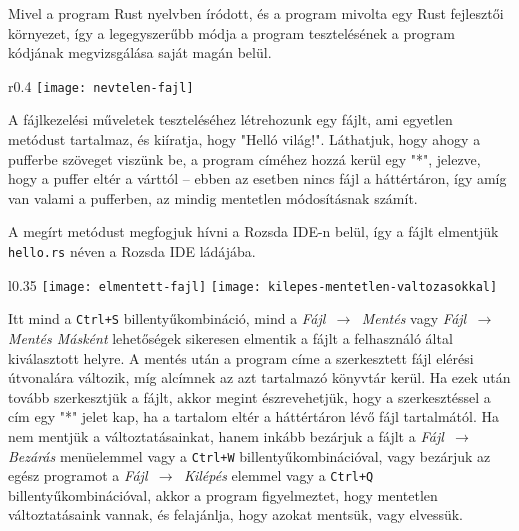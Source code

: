 

Mivel a program Rust nyelvben íródott, és a program mivolta egy Rust fejlesztői környezet,
így a legegyszerűbb módja a program tesztelésének a program kódjának megvizsgálása saját magán belül.


\begin{wrapfigure}{r}{0.4\textwidth}
    \centering
    \texttt{[image: nevtelen-fajl]}
\end{wrapfigure}

A fájlkezelési műveletek teszteléséhez létrehozunk egy fájlt, ami egyetlen metódust tartalmaz,
és kiíratja, hogy "Helló világ!". 
Láthatjuk, hogy ahogy a pufferbe szöveget viszünk be, a program címéhez hozzá kerül egy "*",
jelezve, hogy a puffer eltér a várttól -- ebben az esetben nincs fájl a háttértáron,
így amíg van valami a pufferben, az mindig mentetlen módosításnak számít.

A megírt metódust megfogjuk hívni a Rozsda IDE-n belül, így a fájlt elmentjük \texttt{hello.rs}
néven a Rozsda IDE ládájába.

\begin{wrapfigure}{l}{0.35\textwidth}
    \centering
    \texttt{[image: elmentett-fajl]}
    \texttt{[image: kilepes-mentetlen-valtozasokkal]}
\end{wrapfigure}

Itt mind a \texttt{Ctrl+S} billentyűkombináció, mind a \textit{Fájl $\,\to\,$ Mentés} vagy \textit{Fájl $\,\to\,$ Mentés Másként}
lehetőségek sikeresen elmentik a fájlt a felhasználó által kiválasztott helyre.
A mentés után a program címe a szerkesztett fájl elérési útvonalára változik,
míg alcímnek az azt tartalmazó könyvtár kerül.
Ha ezek után tovább szerkesztjük a fájlt, akkor megint észrevehetjük,
hogy a szerkesztéssel a cím egy "*" jelet kap, ha a tartalom eltér a háttértáron lévő fájl tartalmától.
Ha nem mentjük a változtatásainkat, 
hanem inkább bezárjuk a fájlt a \textit{Fájl $\,\to\,$ Bezárás} menüelemmel vagy a \texttt{Ctrl+W} billentyűkombinációval,
vagy bezárjuk az egész programot a \textit{Fájl $\,\to\,$ Kilépés} elemmel vagy a \texttt{Ctrl+Q} billentyűkombinációval,
akkor a program figyelmeztet, hogy mentetlen változtatásaink vannak,
és felajánlja, hogy azokat mentsük, vagy elvessük.

